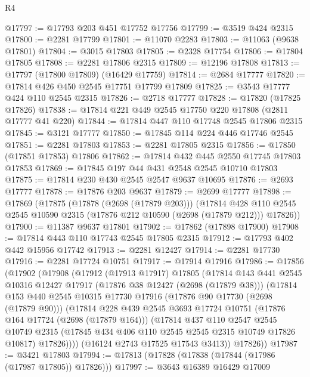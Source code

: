 \begin{lexlean}{R4}
\begin{coremodule}
@17797 := @17793 @203 @451 @17752 @17756
@17799 := @3519 @424 @2315
@17800 := @2281 @17799
@17801 := @11070 @2283
@17803 := @11063 (@9638 @17801)
@17804 := @3015 @17803
@17805 := @2328 @17754
@17806 := @17804 @17805
@17808 := @2281 @17806 @2315
@17809 := @12196 @17808
@17813 := @17797 (@17800 @17809) (@16429 @17759)
@17814 := @2684 @17777
@17820 := @17814 @426 @450 @2545 @17751 @17799 @17809
@17825 := @3543 @17777 @424 @110 @2545 @2315
@17826 := @2718 @17777
@17828 := @17820 (@17825 @17826)
@17838 := @17814 @221 @449 @2545 @17750 @220 @17808 (@2811 @17777 @41 @220)
@17844 := @17814 @447 @110 @17748 @2545 @17806 @2315
@17845 := @3121 @17777
@17850 := @17845 @114 @224 @446 @17746 @2545
@17851 := @2281 @17803
@17853 := @2281 @17805 @2315
@17856 := @17850 (@17851 @17853) @17806
@17862 := @17814 @432 @445 @2550 @17745 @17803 @17853
@17869 := @17845 @197 @44 @431 @2548 @2545 @10710 @17803
@17875 := @17814 @230 @430 @2545 @2547 @9637 @10695
@17876 := @2693 @17777
@17878 := @17876 @203 @9637
@17879 := @2699 @17777
@17898 := @17869
    (@17875
      (@17878 (@2698 (@17879 @203)))
      (@17814 @428 @110 @2545 @2545 @10590 @2315 (@17876 @212 @10590 (@2698 (@17879 @212))) @17826))
@17900 := @11387 @9637 @17801
@17902 := @17862 (@17898 @17900)
@17908 := @17814 @443 @110 @17743 @2545 @17805 @2315
@17912 := @17793 @402 @442 @15956 @17742
@17913 := @2281 @12427
@17914 := @2281 @17730
@17916 := @2281 @17724 @10751
@17917 := @17914 @17916
@17986 := @17856
    (@17902
      (@17908
        (@17912
          (@17913 @17917)
          @17805
          (@17814
            @143
            @441
            @2545
            @10316
            @12427
            @17917
            (@17876 @38 @12427 (@2698 (@17879 @38)))
            (@17814
              @153
              @440
              @2545
              @10315
              @17730
              @17916
              (@17876 @90 @17730 (@2698 (@17879 @90)))
              (@17814
                @228
                @439
                @2545
                @3693
                @17724
                @10751
                (@17876 @164 @17724 (@2698 (@17879 @164)))
                (@17814
                  @437
                  @110
                  @2547
                  @2545
                  @10749
                  @2315
                  (@17845 @434 @406 @110 @2545 @2545 @2315 @10749 @17826 @10817)
                  @17826))))
          (@16124 @2743 @17525 @17543 @3413))
        @17826))
@17987 := @3421 @17803
@17994 := @17813 (@17828 (@17838 (@17844 (@17986 (@17987 @17805)) @17826)))
@17997 := @3643 @16389 @16429 @17009

\end{coremodule}
\end{lexlean}
